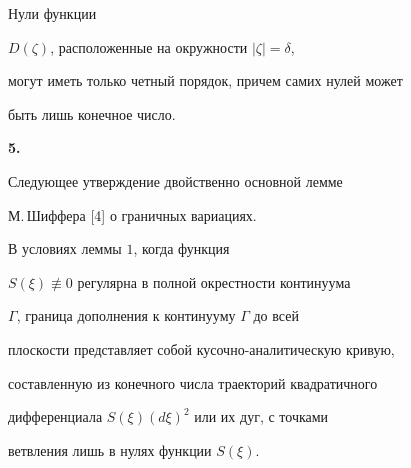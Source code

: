 \begin{cornonum}


Нули функции


$D(\zeta)$, расположенные на окружности $|\zeta|=\delta$,


могут иметь только четный порядок, причем самих нулей может 


быть лишь конечное число.


\end{cornonum}





{\bf 5.}


Следующее утверждение двойственно основной лемме 


М.\,Шиффера [4] о граничных вариациях. 





\begin{lem}


В условиях леммы $1$, когда функция 


$S(\xi)\not\equiv 0$ регулярна в полной окрестности континуума 


$\Gamma$, граница дополнения к континууму $\Gamma$ до всей


плоскости представляет собой кусочно-аналитическую кривую, 


составленную из конечного числа траекторий квадратичного 


дифференциала $S(\xi)(d\xi)^{2}$ или их дуг, с точками 


ветвления лишь в нулях функции $S(\xi)$.


\end{lem}





